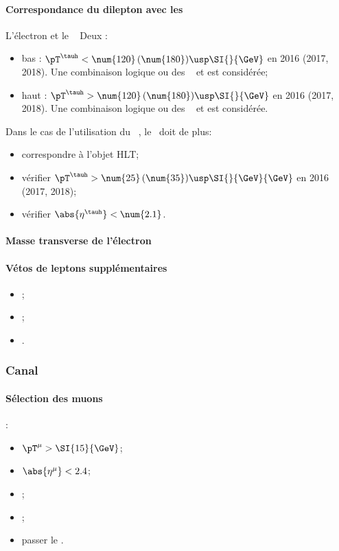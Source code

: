 \paragraph{Correspondance du dilepton avec les \HLTpaths}
L'électron et le \tauh\ \FromPairMatchToHLTObjects{}
Deux \HLTregionsDefined:
\begin{itemize}
    \item bas \pT: $\pT^{\tauh} < \num{120} \, (\num{180}) \usp \SI{}{\GeV}$ en 2016 (2017, 2018).
        Une combinaison logique \og ou \fg{} des \HLTpaths\ \HLTSingleEle{} et \HLTEleTauCross{} est considérée;
    \item haut \pT: $\pT^{\tauh} > \num{120} \, (\num{180}) \usp \SI{}{\GeV}$ en 2016 (2017, 2018).
        Une combinaison logique \og ou \fg{} des \HLTpaths\ \HLTSingleEle{} et \HLTSingleTau{} est considérée.
\end{itemize}
Dans le cas de l'utilisation du \HLTpath\ \HLTEleTauCross{}, le \tauh\ doit de plus:
\begin{itemize}
    \item correspondre à l'objet HLT;
    \item vérifier $\pT^{\tauh} > \num{25} \, (\num{35}) \usp \SI{}{\GeV}{\GeV}$ en 2016 (2017, 2018);
    \item vérifier $\abs{\eta^{\tauh}} < \num{2.1}$.
\end{itemize}
\paragraph{Masse transverse de l'électron}
\paragraph{Vétos de leptons supplémentaires}
\LeptonVetoes
\begin{itemize}
    \item \LeptonVetoesExtraMuon;
    \item \LeptonVetoesSecondEle;
    \item \LeptonVetoesElectronPair.
\end{itemize}

\subsubsection{Canal \ele\mu}\label{chapter-HTT_analysis-section-offline-em}
\paragraph{Sélection des muons}
:
\begin{itemize}
    \item $\pT^{\mu} > \SI{15}{\GeV}$;
    \item $\abs{\eta^{\mu}} < 2.4$;
    \item \Leptondzdxy;
    \item {};
    \item passer le \MediumMuonID.
\end{itemize}
